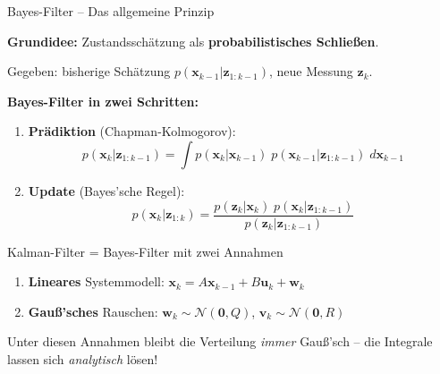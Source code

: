 \documentclass[%
  aspectratio=169,
  10pt
]{beamer}
\newcommand{\hl}[1]{{\color{fbblau}\textbf{#1}}}
\begin{document}
\begin{frame}{Bayes-Filter -- Das allgemeine Prinzip}

\textbf{Grundidee:} Zustandsschätzung als \hl{probabilistisches Schließen}.

\vspace{2mm}
Gegeben: bisherige Schätzung $p(\mathbf{x}_{k-1} | \mathbf{z}_{1:k-1})$, neue Messung $\mathbf{z}_k$.

\vspace{2mm}
\textbf{Bayes-Filter in zwei Schritten:}
\begin{enumerate}
  \item \textbf{Prädiktion} (Chapman-Kolmogorov):
        \[
          p(\mathbf{x}_k | \mathbf{z}_{1:k-1})
          = \int p(\mathbf{x}_k | \mathbf{x}_{k-1})\;
                p(\mathbf{x}_{k-1} | \mathbf{z}_{1:k-1})\;d\mathbf{x}_{k-1}
        \]
  \item \textbf{Update} (Bayes'sche Regel):
        \[
          p(\mathbf{x}_k | \mathbf{z}_{1:k})
          = \frac{p(\mathbf{z}_k | \mathbf{x}_k)\;
                  p(\mathbf{x}_k | \mathbf{z}_{1:k-1})}
                 {p(\mathbf{z}_k | \mathbf{z}_{1:k-1})}
        \]
\end{enumerate}

\pause
\vspace{1mm}
\begin{block}{Kalman-Filter = Bayes-Filter mit zwei Annahmen}
  \begin{enumerate}
    \item \textbf{Lineares} Systemmodell: $\mathbf{x}_k = A\mathbf{x}_{k-1} + B\mathbf{u}_k + \mathbf{w}_k$
    \item \textbf{Gauß'sches} Rauschen: $\mathbf{w}_k \sim \mathcal{N}(\mathbf{0},Q)$, \;
          $\mathbf{v}_k \sim \mathcal{N}(\mathbf{0},R)$
  \end{enumerate}
  Unter diesen Annahmen bleibt die Verteilung \emph{immer} Gauß'sch --
  die Integrale lassen sich \emph{analytisch} lösen!
\end{block}

\end{frame}
\end{document}
